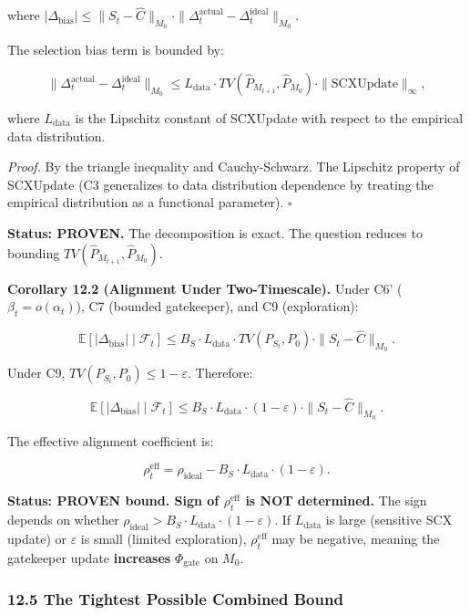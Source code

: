 \documentclass[
  12pt,
]{article}
\begin{document}
where
\(|\Delta_{\text{bias}}| \leq \|S_t - \hat{C}\|_{M_0} \cdot \|\Delta_t^{\text{actual}} - \Delta_t^{\text{ideal}}\|_{M_0}\).

The selection bias term is bounded by:

\[\|\Delta_t^{\text{actual}} - \Delta_t^{\text{ideal}}\|_{M_0} \leq L_{\text{data}} \cdot TV(\hat{P}_{M_{t+1}}, \hat{P}_{M_0}) \cdot \|\text{SCXUpdate}\|_\infty,\]

where \(L_{\text{data}}\) is the Lipschitz constant of SCXUpdate with
respect to the empirical data distribution.

\emph{Proof.} By the triangle inequality and Cauchy-Schwarz. The
Lipschitz property of SCXUpdate (C3 generalizes to data distribution
dependence by treating the empirical distribution as a functional
parameter). \(\square\)

\textbf{Status: PROVEN.} The decomposition is exact. The question
reduces to bounding \(TV(\hat{P}_{M_{t+1}}, \hat{P}_{M_0})\).

\textbf{Corollary 12.2 (Alignment Under Two-Timescale).} Under C6'
(\(\beta_t = o(\alpha_t)\)), C7 (bounded gatekeeper), and C9
(exploration):

\[\mathbb{E}[|\Delta_{\text{bias}}| \mid \mathcal{F}_t] \leq B_S \cdot L_{\text{data}} \cdot TV(P_{S_t}, P_0) \cdot \|S_t - \hat{C}\|_{M_0}.\]

Under C9, \(TV(P_{S_t}, P_0) \leq 1 - \varepsilon\). Therefore:

\[\mathbb{E}[|\Delta_{\text{bias}}| \mid \mathcal{F}_t] \leq B_S \cdot L_{\text{data}} \cdot (1 - \varepsilon) \cdot \|S_t - \hat{C}\|_{M_0}.\]

The effective alignment coefficient is:

\[\rho_t^{\text{eff}} = \rho_{\text{ideal}} - B_S \cdot L_{\text{data}} \cdot (1 - \varepsilon).\]

\textbf{Status: PROVEN bound. Sign of \(\rho_t^{\text{eff}}\) is NOT
determined.} The sign depends on whether
\(\rho_{\text{ideal}} > B_S \cdot L_{\text{data}} \cdot (1 - \varepsilon)\).
If \(L_{\text{data}}\) is large (sensitive SCX update) or
\(\varepsilon\) is small (limited exploration), \(\rho_t^{\text{eff}}\)
may be negative, meaning the gatekeeper update \textbf{increases}
\(\Phi_{\text{gate}}\) on \(M_0\).

\subsubsection{12.5 The Tightest Possible Combined
Bound}\label{the-tightest-possible-combined-bound}
\end{document}
